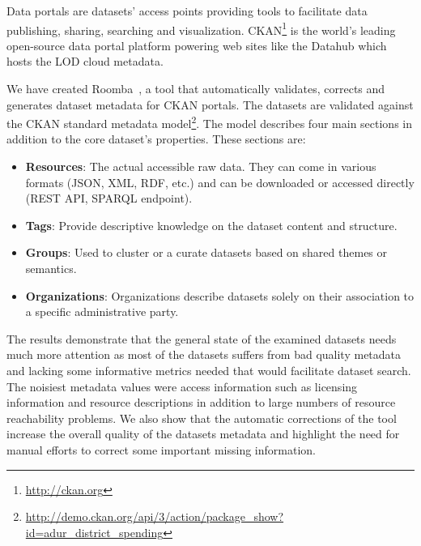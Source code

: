 \documentclass[runningheads,a4paper]{../../Tools/LaTEX/llncs}
\begin{document}
Data portals are datasets' access points providing tools to facilitate data publishing, sharing, searching and visualization. CKAN\footnote{\url{http://ckan.org}} is the world's leading open-source data portal platform powering web sites like the Datahub which hosts the LOD cloud metadata.

We have created Roomba~\cite{Assaf:WWW:15}, a tool that automatically validates, corrects and generates dataset metadata for CKAN portals. The datasets are validated against the CKAN standard metadata model\footnote{\url{http://demo.ckan.org/api/3/action/package_show?id=adur_district_spending}}. The model describes four main sections in addition to the core dataset's properties. These sections are:
\begin{itemize}
  \item \textbf{Resources}: The actual accessible raw data. They can come in various formats (JSON, XML, RDF, etc.) and can be downloaded or accessed directly (REST API, SPARQL endpoint).
  \item \textbf{Tags}: Provide descriptive knowledge on the dataset content and structure.
  \item \textbf{Groups}: Used to cluster or a curate datasets based on shared themes or semantics.
  \item \textbf{Organizations}: Organizations describe datasets solely on their association to a specific administrative party.
\end{itemize}
The results demonstrate that the general state of the examined datasets needs much more attention as most of the datasets suffers from bad quality metadata and lacking some informative metrics needed that would facilitate dataset search. The noisiest metadata values were access information such as licensing information and resource descriptions in addition to large numbers of resource reachability problems. We also show that the automatic corrections of the tool increase the overall quality of the datasets metadata and highlight the need for manual efforts to correct some important missing information.

\end{document}

